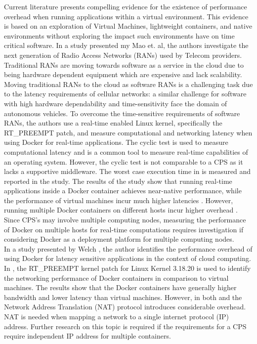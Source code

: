 Current literature \cite{p6} presents compelling evidence for the existence of performance overhead when running applications within a virtual environment. This evidence is based on an exploration of Virtual Machines, lightweight containers, and native environments without exploring the impact such environments have on time critical software. In a study presented my Mao et. al, the authors investigate the next generation of Radio Access Networks (RANs) used by Telecom providers. Traditional RANs are moving towards software as a service in the cloud \cite{p1} due to being hardware dependent equipment which are expensive and lack scalability. Moving traditional RANs to the cloud as software RANs is a challenging task due to the latency requirements of cellular networks: a similar challenge for software with high hardware dependability and time-sensitivity face the domain of autonomous vehicles. To overcome the time-sensitive requirements of software RANs, the authors use a real-time enabled Linux kernel, specifically the RT\_PREEMPT patch, and measure computational and networking latency when using Docker for real-time applications. The cyclic test \cite{cycl} is used to measure computational latency and is a common tool to measure real-time capabilities of an operating system. However, the cyclic test is not comparable to a CPS as it lacks a supportive middleware. The worst case execution time in \cite{p1} is measured and reported in the study. The results of the study show that running real-time applications inside a Docker container achieves near-native performance, while the performance of virtual machines incur much higher latencies \cite{p1}. However, running multiple Docker containers on different hosts incur higher overhead \cite{p1}. Since CPS's may involve multiple computing nodes, measuring the performance of Docker on multiple hosts for real-time computations requires investigation if considering Docker as a deployment platform for multiple computing nodes.  \\

In a study presented by Welch \cite{c2}, the author identifies the performance overhead of using Docker for latency sensitive applications in the context of cloud computing. In \cite{c2}, the RT\_PREEMPT kernel patch for Linux Kernel 3.18.20 is used to identify the networking performance of Docker containers in comparison to virtual machines. The results show that the Docker containers have generally higher bandwidth and lower latency than virtual machines. However, in both \cite{Andreas} and \cite{p6} the Network Address Translation (NAT) protocol introduces considerable overhead. NAT is needed when mapping a network to a single internet protocol (IP) address. Further research on this topic is required if the requirements for a CPS require independent IP address for multiple containers. \\

